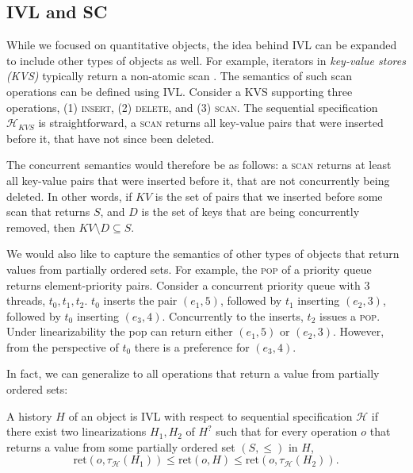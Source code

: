 \subsection{IVL and SC}
\label{ivl-sec:other-objects}

While we focused on quantitative objects, the idea behind IVL can be
expanded to include other types of objects as well. For example, iterators
in \emph{key-value stores (KVS)} typically return a non-atomic scan .
The semantics of such scan operations can be defined using IVL. Consider a KVS supporting
three operations, (1) \textsc{insert}, (2) \textsc{delete}, and (3) \textsc{scan}.
The sequential specification $\mathcal{H}_{KVS}$ is straightforward, a \textsc{scan}
returns all key-value pairs that were inserted before it, that have not since been deleted.

The concurrent semantics would therefore be as follows: a \textsc{scan} returns at least
all key-value pairs that were inserted before it, that are not concurrently being deleted.
In other words, if $KV$ is the set of pairs that we inserted before some scan that returns $S$, and $D$ is the
set of keys that are being concurrently removed, then $KV \setminus D \subseteq S$.

We would also like to capture the semantics of other types of objects that return values from
partially ordered sets. For example, the \textsc{pop} of a priority queue  returns
element-priority pairs. Consider a concurrent priority queue with $3$ threads, $t_0,t_1,t_2$.
$t_0$ inserts the pair $(e_1,5)$, followed by $t_1$ inserting $(e_2,3)$, followed by $t_0$
inserting $(e_3,4)$. Concurrently to the inserts, $t_2$ issues a \textsc{pop}. Under linearizability
the pop can return either $(e_1,5)$ or $(e_2,3)$. However, from the perspective of $t_0$ there
is a preference for $(e_3,4)$. 

In fact, we can generalize to all operations that return a value from partially ordered sets:
\begin{definition}
    A history $H$ of an object is IVL with respect to sequential specification $\mathcal{H}$ if there
    exist two linearizations $H_1, H_2$ of $H^?$ such that for every operation $o$ that returns a
    value from some partially ordered set $(S, \leq)$ in $H$,
    \[\text{ret}(o, \tau_\mathcal{H}(H_1)) \leq \text{ret}(o, H) \leq \text{ret}(o, \tau_\mathcal{H}(H_2)). \]
    \label{ivl-def:poset-ivl}
\end{definition}

